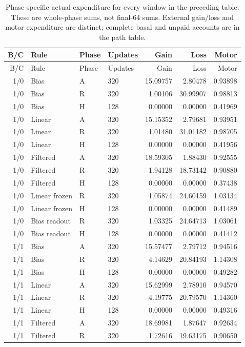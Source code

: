 \begin{longtable}{rlllrrr}
\caption{Phase-specific actual expenditure for every window in the preceding table. These are whole-phase sums, not final-64 sums. External gain/loss and motor expenditure are distinct; complete basal and unpaid accounts are in the path table.}\label{tab:gain-phase-costs}\\
\toprule
B/C & Rule & Phase & Updates & Gain & Loss & Motor \\
\midrule
\endfirsthead
\toprule
B/C & Rule & Phase & Updates & Gain & Loss & Motor \\
\midrule
\endhead
1/0 & Bias & A & 320 & 15.09757 & 2.80478 & 0.93898 \\
1/0 & Bias & R & 320 & 1.00106 & 30.99907 & 0.98813 \\
1/0 & Bias & H & 128 & 0.00000 & 0.00000 & 0.41969 \\
1/0 & Linear & A & 320 & 15.15352 & 2.79681 & 0.93951 \\
1/0 & Linear & R & 320 & 1.01480 & 31.01182 & 0.98705 \\
1/0 & Linear & H & 128 & 0.00000 & 0.00000 & 0.41956 \\
1/0 & Filtered & A & 320 & 18.59305 & 1.88430 & 0.92555 \\
1/0 & Filtered & R & 320 & 1.94128 & 18.73142 & 0.90880 \\
1/0 & Filtered & H & 128 & 0.00000 & 0.00000 & 0.37438 \\
1/0 & Linear frozen & R & 320 & 1.05874 & 24.60159 & 1.03134 \\
1/0 & Linear frozen & H & 128 & 0.00000 & 0.00000 & 0.41489 \\
1/0 & Bias readout & R & 320 & 1.03325 & 24.64713 & 1.03061 \\
1/0 & Bias readout & H & 128 & 0.00000 & 0.00000 & 0.41412 \\
1/1 & Bias & A & 320 & 15.57477 & 2.79712 & 0.94516 \\
1/1 & Bias & R & 320 & 4.14629 & 20.84193 & 1.14308 \\
1/1 & Bias & H & 128 & 0.00000 & 0.00000 & 0.49282 \\
1/1 & Linear & A & 320 & 15.62999 & 2.78910 & 0.94570 \\
1/1 & Linear & R & 320 & 4.19775 & 20.79570 & 1.14360 \\
1/1 & Linear & H & 128 & 0.00000 & 0.00000 & 0.49316 \\
1/1 & Filtered & A & 320 & 18.69981 & 1.87647 & 0.92634 \\
1/1 & Filtered & R & 320 & 1.72616 & 19.63175 & 0.90650 \\

\end{longtable}
